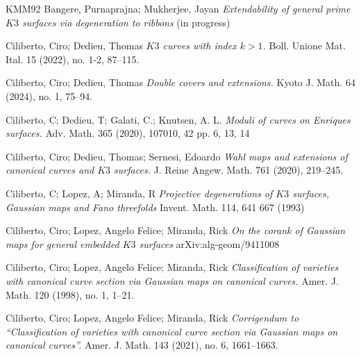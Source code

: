 \documentclass[11pt,twoside]{amsart}
\theoremstyle{plain}
\numberwithin{equation}{section}
\theoremstyle{definition}
\begin{document}
\begin{thebibliography}{KMM92}
Bangere, Purnaprajna; Mukherjee, Jayan  
\emph{Extendability of general prime $K3$ surfaces via degeneration to ribbons} (in progress)






Ciliberto, Ciro; Dedieu, Thomas
\emph{$K3$ curves with index $k>1$.}
Boll. Unione Mat. Ital. 15 (2022), no. 1-2, 87–115.

Ciliberto, Ciro; Dedieu, Thomas
\emph{Double covers and extensions.}
Kyoto J. Math. 64 (2024), no. 1, 75–94.


Ciliberto, C; Dedieu, T;  Galati, C.; Knutsen, A. L.  
\emph{Moduli of curves on Enriques surfaces.}
Adv. Math. 365 (2020), 107010, 42 pp. 6, 13, 14

Ciliberto, Ciro; Dedieu, Thomas; Sernesi, Edoardo
\emph{Wahl maps and extensions of canonical curves and $K3$ surfaces.}
J. Reine Angew. Math. 761 (2020), 219–245.

Ciliberto, C; Lopez, A; Miranda, R
\emph{Projective degenerations of $K3$ surfaces, Gaussian maps and Fano threefolds}
Invent. Math. 114, 641 667 (1993)

Ciliberto, Ciro; Lopez, Angelo Felice; Miranda, Rick
\emph{On the corank of Gaussian maps for general embedded $K3$ surfaces}
arXiv:alg-geom/9411008

Ciliberto, Ciro; Lopez, Angelo Felice; Miranda, Rick
\emph{Classification of varieties with canonical curve section via Gaussian maps on canonical curves.}
Amer. J. Math.   120 (1998), no. 1, 1–21.

Ciliberto, Ciro; Lopez, Angelo Felice; Miranda, Rick
\emph{Corrigendum to ``Classification of varieties with canonical curve section via Gaussian maps on canonical curves''.}
Amer. J. Math. 143 (2021), no. 6, 1661–1663.


\end{thebibliography}
\end{document}
